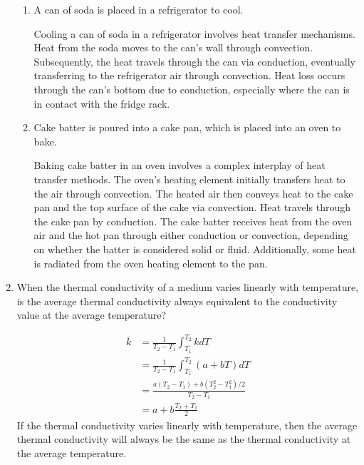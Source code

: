 \documentclass{zc-ust-hw}
\begin{document}
\begin{enumerate}
\begin{enumerate}
      \item A can of soda is placed in a refrigerator to cool. 
        \begin{sol}
          Cooling a can of soda in a refrigerator involves heat transfer
          mechanisms. Heat from the soda moves to the can's wall through
          convection. Subsequently, the heat travels through the can via
          conduction, eventually transferring to the refrigerator air through
          convection. Heat loss occurs through the can's bottom due to
          conduction, especially where the can is in contact with the fridge
          rack.
        \end{sol}
      \item Cake batter is poured into a cake pan, which is placed into an oven to bake. 
        \begin{sol}
          Baking cake batter in an oven involves a complex interplay of heat
          transfer methods. The oven's heating element initially transfers heat
          to the air through convection. The heated air then conveys heat to
          the cake pan and the top surface of the cake via convection. Heat
          travels through the cake pan by conduction. The cake batter receives
          heat from the oven air and the hot pan through either conduction or
          convection, depending on whether the batter is considered solid or
          fluid. Additionally, some heat is radiated from the oven heating
          element to the pan.
        \end{sol}
    \end{enumerate}
  \item When the thermal conductivity of a medium varies linearly with
    temperature, is the average thermal conductivity always equivalent to the
    conductivity value at the average temperature? 
    \begin{sol}
      \begin{align}
        \bar{k}&=\frac{1}{T_2-T_1} \int_{T_1}^{T_2} k d T \\
               &=\frac{1}{T_2-T_1} \int_{T_1}^{T_2}(a+b T) d T\\
               &=\frac{a\left(T_2-T_1\right)+b\left(T_2^2-T_1^2\right) / 2}{T_2-T_1}\\
               &=a+b \frac{T_2+T_1}{2}
      \end{align}
      If the thermal conductivity varies linearly with temperature, then the
      average thermal conductivity will always be the same as the thermal
      conductivity at the average temperature.
    \end{sol}


\end{enumerate}
\end{document}
